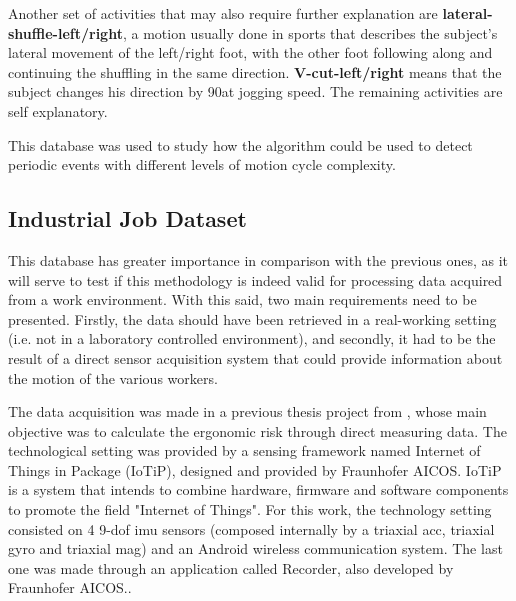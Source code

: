 Another set of activities that may also require further explanation are \textbf{lateral-shuffle-left/right}, a motion usually done in sports that describes the subject's lateral movement of the left/right foot, with the other foot following along and continuing the shuffling in the same direction. \textbf{V-cut-left/right} means that the subject changes his direction by 90\degree at jogging speed. The remaining activities are self explanatory.

This database was used to study how the algorithm could be used to detect periodic events with different levels of motion cycle complexity. 

\subsection{Industrial Job Dataset}
\label{sec:industry}

This database has greater importance in comparison with the previous ones, as it will serve to test if this methodology is indeed valid for processing data acquired from a work environment. With this said, two main requirements need to be presented. Firstly, the data should have been retrieved in a real-working setting (i.e. not in a laboratory controlled environment), and secondly, it had to be the result of a direct sensor acquisition system that could provide information about the motion of the various workers.

The data acquisition was made in a previous thesis project from \cite{santos2019}, whose main objective was to calculate the ergonomic risk through  direct measuring data. 
The technological setting was provided by a sensing framework named Internet of Things in Package (IoTiP), designed and provided by Fraunhofer AICOS. IoTiP is a system that intends to combine hardware, firmware and software components to promote the field "Internet of Things"\cite{FraunhoferAICOS}. For this work, the technology setting consisted on 4 9-\gls{dof} \gls{imu} sensors (composed internally by a triaxial \gls{acc}, triaxial \gls{gyro} and triaxial \gls{mag}) and an Android wireless communication system. The last one was made through an application called Recorder, also developed by Fraunhofer AICOS.\cite{santos2019}.


